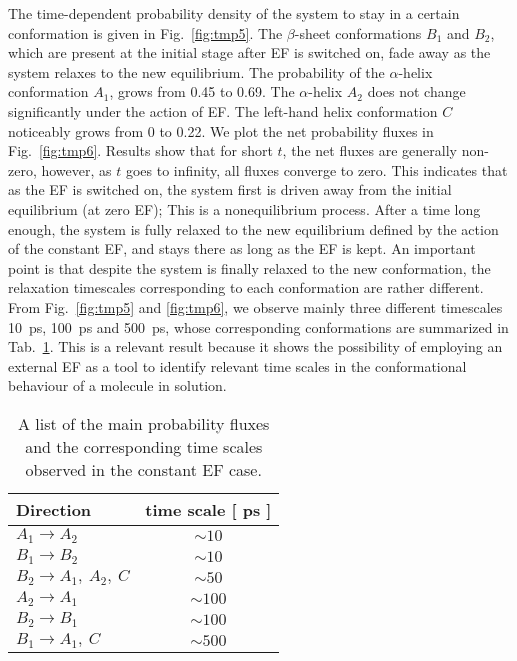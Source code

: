 \documentclass[a4paper,preprint,unsortedaddress,onecolumn]{revtex4-1}
\begin{document}
The time-dependent probability density of the system to stay in a certain
conformation is given in
Fig.~\ref{fig:tmp5}. The $\beta$-sheet conformations $B_1$ and $B_2$,
which are present at the initial stage after EF is switched on,
fade away as the system relaxes to the new equilibrium. The
probability of the $\alpha$-helix conformation $A_1$, grows from 0.45 to 0.69.
The $\alpha$-helix $A_2$  does not change significantly  under the action of EF.
The left-hand helix conformation $C$ noticeably grows from 0 to 0.22.
We plot the net probability fluxes in Fig.~\ref{fig:tmp6}.
Results show that for short $t$, the net fluxes are generally non-zero, however, 
as $t$ goes to infinity,
all fluxes converge to zero. This indicates
that as the EF is switched on, the system first is driven away from the initial
equilibrium (at zero EF);  This is a nonequilibrium process.
After a time long enough, the system
is fully relaxed to the new equilibrium defined by the action of the constant EF,
and stays there as long as the EF is kept.
An important point is that despite the system is finally relaxed to the new conformation,
the relaxation timescales corresponding to each conformation are rather different. 
From Fig.~\ref{fig:tmp5} and \ref{fig:tmp6}, we observe mainly
three different timescales 10~ps, 100~ps and 500~ps,
whose corresponding conformations are summarized in Tab.~\ref{tab:tmp1}.
This is a relevant result because it shows the possibility of employing an external EF as a tool to identify relevant time scales in the conformational behaviour of a molecule in solution.

\begin{table}
  \centering
  \begin{tabular*}{0.4\textwidth}{@{\extracolsep{\fill}}lc}\hline\hline
    Direction        & time scale [ ps ] \\\hline
    $A_1\rightarrow A_2$        &       $\sim 10$      \\
    $B_1\rightarrow B_2$        &       $\sim 10$      \\    
    $B_2\rightarrow A_1,\ A_2,\ C$        &       $\sim 50$      \\    
    $A_2\rightarrow A_1$        &       $\sim 100$      \\
    $B_2\rightarrow B_1$        &       $\sim 100$      \\    
    $B_1\rightarrow A_1,\ C$        &       $\sim 500$      \\    \hline\hline
  \end{tabular*}
  \caption{A list of the main probability fluxes and the corresponding time scales observed in the constant EF case.}
  \label{tab:tmp1}
\end{table}
\end{document}
